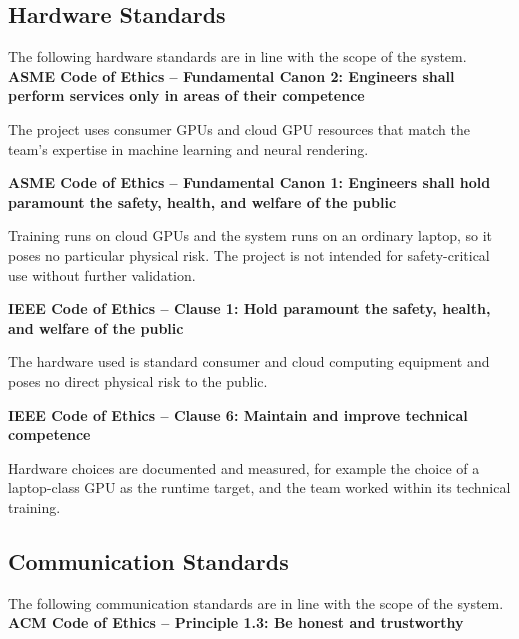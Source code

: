\subsection{Hardware Standards}

The following hardware standards are in line with the scope of the system.\\


\textbf{ASME Code of Ethics -- Fundamental Canon 2: Engineers shall perform services only in areas of their competence}

\noindent
The project uses consumer GPUs and cloud GPU resources that match the team's expertise in machine learning and neural rendering.

\vspace{0.5cm}


\textbf{ASME Code of Ethics -- Fundamental Canon 1: Engineers shall hold paramount the safety, health, and welfare of the public}

\noindent
Training runs on cloud GPUs and the system runs on an ordinary laptop, so it poses no particular physical risk. The project is not intended for safety-critical use without further validation.

\vspace{0.5cm}


\textbf{IEEE Code of Ethics -- Clause 1: Hold paramount the safety, health, and welfare of the public}

\noindent
The hardware used is standard consumer and cloud computing equipment and poses no direct physical risk to the public.

\vspace{0.5cm}


\textbf{IEEE Code of Ethics -- Clause 6: Maintain and improve technical competence}

\noindent
Hardware choices are documented and measured, for example the choice of a laptop-class GPU as the runtime target, and the team worked within its technical training.


\subsection{Communication Standards}

The following communication standards are in line with the scope of the system.\\


\textbf{ACM Code of Ethics -- Principle 1.3: Be honest and trustworthy}

